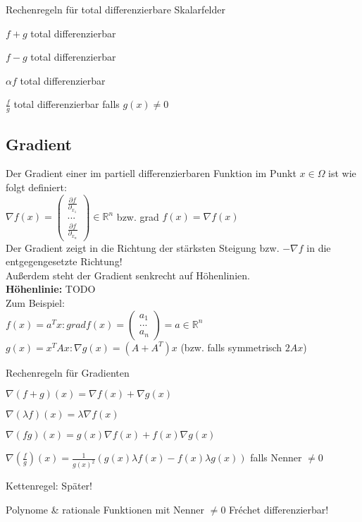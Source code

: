\documentclass[german]{latex4ei/latex4ei_sheet}
\begin{document}
\begin{sectionbox}
	\begin{cookbox}{Rechenregeln f\"ur total differenzierbare Skalarfelder}
	\item $f+g$ total differenzierbar
	\item $f-g$ total differenzierbar
	\item $\alpha f$ total differenzierbar
	\item $\frac{f}{g}$ total differenzierbar falls $g(x) \neq 0$
\end{cookbox}

\end{sectionbox}
\begin{sectionbox}
	
	\subsection{Gradient}
	Der Gradient einer im partiell differenzierbaren Funktion im Punkt $x \in \Omega$ ist wie folgt definiert:\\
	$\nabla f(x) = 
	\begin{pmatrix}
		\frac{\partial f}{\partial_{x_1}} \\ ... \\ \frac{\partial f}{\partial_{x_n}}	
	\end{pmatrix}
	\in \mathbb{R}^n$ bzw. grad $ f(x) = \nabla f(x)$\\
	Der Gradient zeigt in die Richtung der st\"arksten Steigung bzw. $- \nabla f$ in die entgegengesetzte Richtung!\\
	Au\ss{}erdem steht der Gradient senkrecht auf H\"ohenlinien.\\
	\textbf{H\"ohenlinie:} TODO\\
	Zum Beispiel:\\
	$f(x)=a^T x: grad f(x)=
	\begin{pmatrix}
		a_1 \\ ... \\ a_n	
	\end{pmatrix}
	= a \in \mathbb{R}^n$\\
	$g(x)=x^T A x: \nabla g(x)=(A + A^T) x$ (bzw. falls symmetrisch $2 A x$)
	
	\begin{cookbox}{Rechenregeln f\"ur Gradienten}
	\item $\nabla (f+g)(x)=\nabla f(x) + \nabla g(x)$
	\item $\nabla (\lambda f)(x)=\lambda \nabla f(x)$
	\item $\nabla (f g)(x)=g(x) \nabla f(x) + f(x) \nabla g(x)$
	\item $\nabla (\frac{f}{g})(x)=\frac{1}{g(x)^2}(g(x) \lambda f(x) - f(x) \lambda g(x))$ falls Nenner $\neq 0$
	\item Kettenregel: Später!
	\item Polynome \& rationale Funktionen mit Nenner $\neq 0$ Fr\'echet differenzierbar!
\end{cookbox}
\end{sectionbox}
\end{document}

